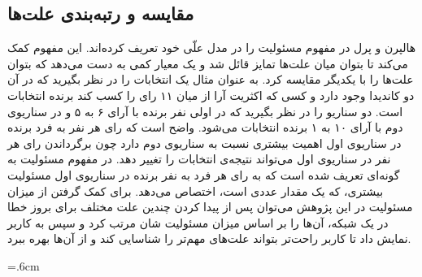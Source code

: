 \documentclass[
msc,
irfonts
]{./tex/tehran-thesis}
\newcommand{\پ}{پروژه/پایان‌نامه/رساله }
\theoremstyle{definition}
\theoremstyle{theorem}
\theoremstyle{definition}
\numberwithin{algorithm}{chapter}
\newlength\mylenapp
\renewcommand\cftchappresnum{\chaptername~}
\newcommand{\lf}[1]{\LTRfootnote{#1}}
\begin{document}
\subsection{مقایسه و رتبه‌بندی علت‌ها}
هالپرن و پرل در 
\cite{hp2}
مفهوم مسئولیت\lf{Responsibility}
را در مدل علّی خود تعریف کرده‌اند.
این مفهوم کمک می‌کند تا بتوان میان علت‌ها تمایز قائل شد و یک معیار کمی به دست می‌دهد که بتوان علت‌ها را با یکدیگر مقایسه کرد.
به عنوان مثال یک انتخابات را در نظر بگیرید که در آن دو کاندیدا وجود دارد و کسی که اکثریت آرا از میان ۱۱ رای را کسب کند برنده انتخابات است. 
دو سناریو را در نظر بگیرید که در اولی نفر برنده با آرای ۶ به ۵ و در سناریوی دوم با آرای ۱۰ به ۱ برنده انتخابات می‌شود.
واضح است که رای هر نفر به فرد برنده در سناریوی اول اهمیت بیشتری نسبت به سناریوی دوم دارد چون برگرداندن رای هر نفر در سناریوی اول می‌تواند نتیجه‌ی انتخابات را تغییر دهد.
در
\cite{hp2}
مفهوم مسئولیت به گونه‌ای تعریف شده است که به رای هر فرد به نفر برنده در سناریوی‌ اول مسئولیت بیشتری، که یک مقدار عددی است، 
اختصاص می‌دهد.
برای کمک گرفتن از میزان مسئولیت در این پژوهش می‌توان پس از پیدا کردن چندین علت مختلف برای بروز خطا در یک شبکه، آن‌ها را بر اساس میزان مسئولیت شان مرتب کرد و سپس به کاربر نمایش داد تا کاربر راحت‌تر بتواند علت‌های مهم‌تر را شناسایی کند و از آن‌ها بهره ببرد.\clearpage{}

\pagestyle{empty}
{
    \small
    \onehalfspacing
      }

\pagestyle{fancy}

\addtocontents{toc}{
    \protect\renewcommand\protect\cftchappresnum{\appendixname~}\protect\setlength{\cftchapnumwidth}{\mylenapp}}




\onehalfspacing
\cleardoublepage
\printindex

\begin{latin}
    \baselineskip=.6cm
    \latinabstract
    \latinTitlePage
\end{latin}
\label{LastPage}
\end{document}
